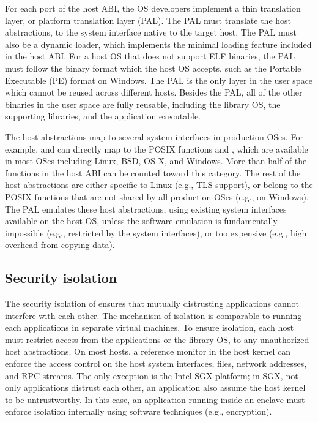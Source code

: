 For each port of the host ABI, the OS developers implement a thin translation layer,
or platform translation layer (PAL). The PAL must translate the host abstractions, to the system interface native to the target host. 
The PAL must also be a dynamic loader, which implements the minimal loading feature included in the host ABI.
For a host OS that does not support ELF binaries, the PAL must follow the binary format which the host OS accepts, such as the Portable Executable (PE) format on Windows.
The PAL is the only layer in the user space which cannot be reused
across different hosts. Besides the PAL, all of the other binaries in the user space are fully reusable, including the library OS, the supporting libraries, and the application executable.



The host abstractions map to several system interfaces in production OSes.
For example,  and  can directly map to the POSIX functions  and , which are available in most OSes including Linux, BSD, OS X, and Windows.
More than half of the functions in the host ABI can be counted toward this category.
The rest of the host abstractions are either specific to Linux
(e.g., TLS support),
or belong to the POSIX functions that are not shared by all production OSes
(e.g.,  on Windows).
The PAL emulates these host abstractions, using existing system interfaces available on the host OS, unless the software emulation is fundamentally impossible (e.g., restricted by the system interfaces), or too expensive (e.g., high overhead from copying data).





\subsection{Security isolation}
\label{sec:overview:host:security}


The security isolation of \graphene{} ensures that mutually distrusting applications cannot interfere with each other. The mechanism of isolation is comparable to running each applications in separate virtual machines.
To ensure isolation, each host must restrict access from the applications or the library OS, to any unauthorized host abstractions.
On most hosts, a reference monitor in the host kernel can enforce the access control on the host system interfaces, files, network addresses, and RPC streams.
The only exception is the Intel SGX platform; in SGX, not only applications distrust each other, an application also assume the host kernel to be untrustworthy.
In this case, an application running inside an enclave must enforce isolation internally using software techniques (e.g., encryption).


